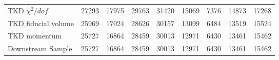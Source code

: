 \begin{landscape}
\begin{table}
\begin{tabular}[pos]{l|cccccccc}
TKD $\chi^2/dof$                                   &   27293  &   17975  &   29763  &   31420  &   15069  &    7376  &   14873  &   17268  \\
TKD fiducial volume                                &   25969  &   17024  &   28626  &   30157  &   13099  &    6484  &   13519  &   15524  \\
TKD momentum                                       &   25727  &   16864  &   28459  &   30013  &   12971  &    6430  &   13461  &   15462  \\
\hline                                            
Downstream Sample                                  &   25727  &   16864  &   28459  &   30013  &   12971  &    6430  &   13461  &   15462  \\
\hline                                            

\end{tabular}
\end{table}
\end{landscape}


